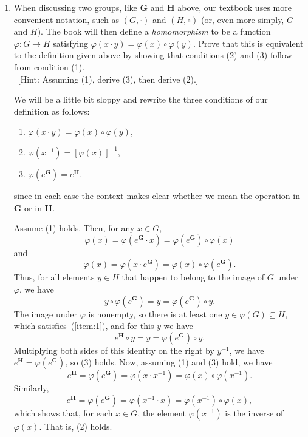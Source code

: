 \documentclass[12pt,reqno]{amsart}
\newcommand{\bG}{\ensuremath{\mathbf{G}}}
\newcommand{\bH}{\ensuremath{\mathbf{H}}}
\newcommand{\<}{\ensuremath{\langle}}
\renewcommand{\>}{\ensuremath{\rangle}}
\begin{document}
\begin{enumerate}[{\bf 1.}]
\item When discussing two groups, like $\bG$ and $\bH$ above,
  our textbook uses more convenient notation, such as 
  $(G, \cdot)$ and $(H, \circ)$ (or, even more simply, $G$ and $H$).  The book will then
  define a \emph{homomorphism} to be a function $\varphi: G\rightarrow H$ satisfying
  $\varphi(x\cdot y) = \varphi(x) \circ \varphi(y)$.
  Prove that this is equivalent to the definition given above by showing that 
  conditions (2) and (3) follow from condition (1).\\
  \ [Hint: Assuming (1), derive (3), then derive (2).]

\medskip
{} 
We will be a little bit sloppy and rewrite the three conditions of our
definition as follows:
\begin{enumerate}[(1)]
\item  $\varphi(x\cdot y) = \varphi(x) \circ \varphi(y)$,
\item  $\varphi(x^{-1}) = [\varphi(x)]^{-1}$,
\item  $\varphi(e^{\bG}) = e^{\bH}$.
\end{enumerate}
since in each case the context makes clear whether we mean the operation in $\bG$ or
in $\bH$.

Assume (1) holds.
  Then, for any $x\in G$, 
\[
\varphi(x)  = \varphi(e^{\bG}\cdot x)  =
\varphi(e^{\bG})\circ \varphi(x) 
\]
and
\[\varphi(x)  = \varphi(x\cdot e^{\bG})  =
\varphi(x) \circ \varphi(e^{\bG}).
\]
Thus, for all elements $y\in H$ that happen to belong to the image of $G$ under
$\varphi$, we have 
\[
\label{item:1}
y\circ \varphi(e^{\bG}) = y = \varphi(e^{\bG}) \circ y.
\]
The image under $\varphi$ is nonempty, so there is at least one 
$y\in \varphi(G) \subseteq H$, which satisfies~(\ref{item:1}), and 
for this $y$ we have
\[
e^{\bH} \circ y = y = \varphi(e^{\bG}) \circ y.
\]
Multiplying both sides of this identity on the right by $y^{-1}$, we
have $e^{\bH}= \varphi(e^{\bG})$, so (3) holds.
Now, assuming (1) and (3) hold, we have
\[
e^{\bH} = \varphi(e^{\bG}) = 
\varphi(x\cdot x^{-1}) = 
\varphi(x)\circ \varphi(x^{-1}).
\]
Similarly, 
\[
e^{\bH} = \varphi(e^{\bG}) = 
\varphi(x^{-1}\cdot x) = 
\varphi(x^{-1}) \circ \varphi(x),
\]
which shows that, for each $x\in G$, the element $\varphi(x^{-1})$ is the
inverse of $\varphi(x)$.  That is, (2) holds.


\end{enumerate}
\end{document}

